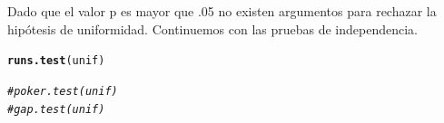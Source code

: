 \documentclass[12 pt]{article}\usepackage[]{graphicx}\usepackage[]{color}
\makeatletter
\newcommand{\hlcom}[1]{\textcolor[rgb]{0.678,0.584,0.686}{\textit{#1}}}%
\newcommand{\hlstd}[1]{\textcolor[rgb]{0.345,0.345,0.345}{#1}}%
\newcommand{\hlkwd}[1]{\textcolor[rgb]{0.737,0.353,0.396}{\textbf{#1}}}%
\newenvironment{kframe}{%
 \def\at@end@of@kframe{}%
 \ifinner\ifhmode%
  \def\at@end@of@kframe{\end{minipage}}%
  \begin{minipage}{\columnwidth}%
 \fi\fi%
 \def\FrameCommand##1{\hskip\@totalleftmargin \hskip-\fboxsep
 \colorbox{shadecolor}{##1}\hskip-\fboxsep
     \hskip-\linewidth \hskip-\@totalleftmargin \hskip\columnwidth}%
 \MakeFramed {\advance\hsize-\width
   \@totalleftmargin\z@ \linewidth\hsize
   \@setminipage}}%
 {\par\unskip\endMakeFramed%
 \at@end@of@kframe}
\newenvironment{knitrout}{}{} %
\makeatother
\begin{document}
\begin{enumerate}
Dado que el valor p es mayor que .05 no existen argumentos para rechazar la hipótesis de uniformidad. Continuemos con las pruebas de independencia.

\begin{knitrout}
\color{fgcolor}\begin{kframe}
\begin{alltt}
\hlkwd{runs.test}\hlstd{(unif)}
\end{alltt}


{\ttfamily\noindent\bfseries{}}\begin{alltt}
\hlcom{#poker.test(unif)}
\hlcom{#gap.test(unif)}
\end{alltt}
\end{kframe}
\end{knitrout}



\end{enumerate}
\end{document}
